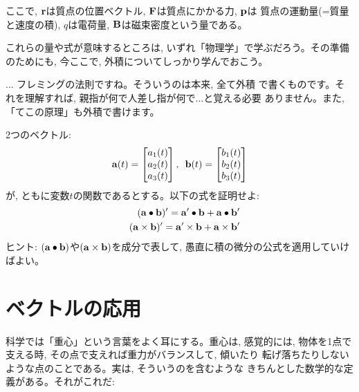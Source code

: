 ここで, ${\bf r}$は質点の位置ベクトル, ${\bf F}$は質点にかかる力, ${\bf p}$は
質点の運動量(=質量と速度の積), $q$は電荷量, 
${\bf B}$は磁束密度という量である。\hv

これらの量や式が意味するところは, いずれ「物理学」で学ぶだろう。その準備のためにも, 
今ここで, 外積についてしっかり学んでおこう。

\begin{faq}{\small{} ... フレミングの法則ですね。そういうのは本来, 全て外積
で書くものです。それを理解すれば, 親指が何で人差し指が何で...と覚える必要
ありません。また, 「てこの原理」も外積で書けます。}\end{faq}
\hv

\begin{q}\label{q:vect_prod_diff} 2つのベクトル: 
\begin{eqnarray*}
{\bf a}(t)=
\begin{bmatrix}
a_1(t)\\
a_2(t)\\
a_3(t)\\
\end{bmatrix},\,\,\,
{\bf b}(t)=
\begin{bmatrix}
b_1(t)\\
b_2(t)\\
b_3(t)\\
\end{bmatrix}
\end{eqnarray*}
が, ともに変数$t$の関数であるとする。以下の式を証明せよ:
\begin{eqnarray}
&&({\bf a}\bullet{\bf b})'={\bf a}'\bullet{\bf b}+{\bf a}\bullet{\bf b}'\label{eq:inprod_diff}\\
&&({\bf a}\times{\bf b})'={\bf a}'\times{\bf b}+{\bf a}\times{\bf b}'\label{eq:vecprod_diff}
\end{eqnarray}
ヒント: $({\bf a}\bullet{\bf b})$や$({\bf a}\times{\bf b})$を成分で表して, 
愚直に積の微分の公式を適用していけばよい。
\end{q}
\hv



\section{ベクトルの応用}

科学では「重心」という言葉をよく耳にする。重心は, 感覚的には, 
物体を1点で支える時, その点で支えれば重力がバランスして, 傾いたり
転げ落ちたりしないような点のことである。実は, そういうのを含むような
きちんとした数学的な定義がある。それがこれだ:

